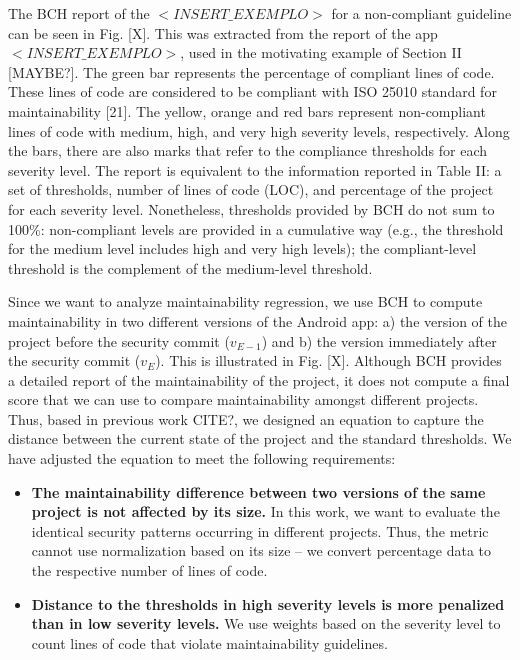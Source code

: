 \documentclass[10pt,conference]{IEEEtran}
\begin{document}
The BCH report of the $<INSERT\_EXEMPLO>$ for a non-compliant guideline can be seen in Fig. [X]. This was extracted from the report of the app $<INSERT\_EXEMPLO>$, used in the motivating example of Section II [MAYBE?]. The green bar represents the percentage of compliant lines of code. These lines of code are considered to be compliant with ISO 25010 standard for maintainability [21]. The yellow, orange and red bars represent non-compliant lines of code with medium, high, and very high severity levels, respectively. Along the bars, there are also marks that refer to the compliance thresholds for each severity level. The report is equivalent to the information reported in Table II: a set of thresholds, number of lines of code (LOC), and percentage of the project for each severity level. Nonetheless, thresholds provided by BCH do not sum to 100\%: non-compliant levels are provided in a cumulative way (e.g., the threshold for the medium level includes high and very high levels); the compliant-level threshold is the complement of the medium-level threshold.

Since we want to analyze maintainability regression, we
use BCH to compute maintainability in two different versions of the Android app: a) the version of the project before the security commit ($v_{E-1}$) and b) the version immediately after the security commit ($v_E$). This is illustrated in Fig. [X].
Although BCH provides a detailed report of the maintainability of the project, it does not compute a final score that we can use to compare maintainability amongst different projects. Thus, based in previous work CITE?, we designed an equation to capture the distance between the current state of the project and the standard thresholds. We have adjusted the equation to meet the following requirements:

\begin{itemize}
	\item \textbf{The maintainability difference between two versions of the same project is not affected by its size.} In this work, we want to evaluate the identical security patterns occurring in different projects. Thus, the metric cannot use normalization based on its size – we convert percentage data to the respective number of lines of code.
	\item \textbf{Distance to the thresholds in high severity levels is more penalized than in low severity levels.} We use weights based on the severity level to count lines of code that violate maintainability guidelines.
\end{itemize}
\end{document}
